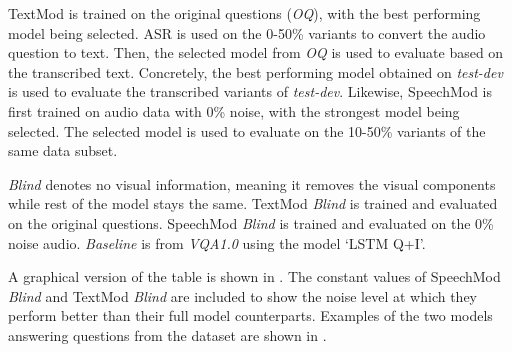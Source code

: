 \documentclass[letterpaper]{article} %
\newcommand{\tz}[1]{\textcolor{purple}{\textit{#1}}}
\begin{document}
TextMod is trained on the original questions (\textit{OQ}), with the best performing model being selected. ASR is used on the 0-50\% variants to convert the audio question to text. Then, the selected model from \textit{OQ} is used to evaluate based on the transcribed text. Concretely, the best performing model obtained on \textit{test-dev} is used to evaluate the transcribed variants of \textit{test-dev}.
Likewise, SpeechMod is first trained on audio data with 0\% noise, with the strongest model being selected. The selected model is used to evaluate on the 10-50\% variants of the same data subset.

\textit{Blind} denotes no visual information, meaning it removes the visual components while rest of the model stays the same. TextMod \textit{Blind} is trained and evaluated on the original questions. SpeechMod \textit{Blind} is trained and evaluated on the 0\% noise audio. \textit{Baseline} is from \textit{VQA1.0} using the model `LSTM Q+I'.

A graphical version of the table is shown in . The constant values of SpeechMod \textit{Blind} and TextMod \textit{Blind} are included to show the noise level at which they perform better than their full model counterparts. Examples of the two models answering questions from the dataset are shown in .

\end{document}
